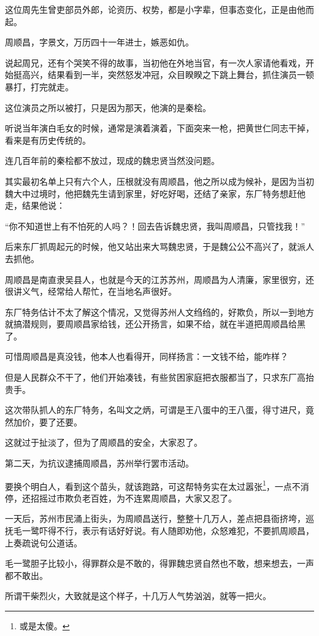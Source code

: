 \begin{multicols}{\theparacolNo}
这位周先生曾吏部员外郎，论资历、权势，都是小字辈，但事态变化，正是由他而起。

周顺昌，字景文，万历四十一年进士，嫉恶如仇。

说起周兄，还有个哭笑不得的故事，当初他在外地当官，有一次人家请他看戏，开始挺高兴，结果看到一半，突然怒发冲冠，众目睽睽之下跳上舞台，抓住演员一顿暴打，打完就走。

这位演员之所以被打，只是因为那天，他演的是秦桧。

听说当年演白毛女的时候，通常是演着演着，下面突来一枪，把黄世仁同志干掉，看来是有历史传统的。

连几百年前的秦桧都不放过，现成的魏忠贤当然没问题。

其实最初名单上只有六个人，压根就没有周顺昌，他之所以成为候补，是因为当初魏大中过境时，他把魏先生请到家里，好吃好喝，还结了亲家，东厂特务想赶他走，结果他说：

“你不知道世上有不怕死的人吗？！回去告诉魏忠贤，我叫周顺昌，只管找我！”

后来东厂抓周起元的时候，他又站出来大骂魏忠贤，于是魏公公不高兴了，就派人去抓他。

周顺昌是南直隶吴县人，也就是今天的江苏苏州，周顺昌为人清廉，家里很穷，还很讲义气，经常给人帮忙，在当地名声很好。

东厂特务估计不太了解这个情况，又觉得苏州人文绉绉的，好欺负，所以一到地方就搞潜规则，要周顺昌家给钱，还公开扬言，如果不给，就在半道把周顺昌给黑了。

可惜周顺昌是真没钱，他本人也看得开，同样扬言：一文钱不给，能咋样？

但是人民群众不干了，他们开始凑钱，有些贫困家庭把衣服都当了，只求东厂高抬贵手。

这次带队抓人的东厂特务，名叫文之炳，可谓是王八蛋中的王八蛋，得寸进尺，竟然加价，要了还要。

这就过于扯淡了，但为了周顺昌的安全，大家忍了。

第二天，为抗议逮捕周顺昌，苏州举行罢市活动。

要换个明白人，看到这个苗头，就该跑路，可这帮特务实在太过嚣张\footnote{或是太傻。}，一点不消停，还招摇过市欺负老百姓，为不连累周顺昌，大家又忍了。

一天后，苏州市民涌上街头，为周顺昌送行，整整十几万人，差点把县衙挤垮，巡抚毛一鹭吓得不行，表示有话好好说。有人随即劝他，众怒难犯，不要抓周顺昌，上奏疏说句公道话。

毛一鹭胆子比较小，得罪群众是不敢的，得罪魏忠贤自然也不敢，想来想去，一声都不敢出。

所谓干柴烈火，大致就是这个样子，十几万人气势汹汹，就等一把火。


\end{multicols}
